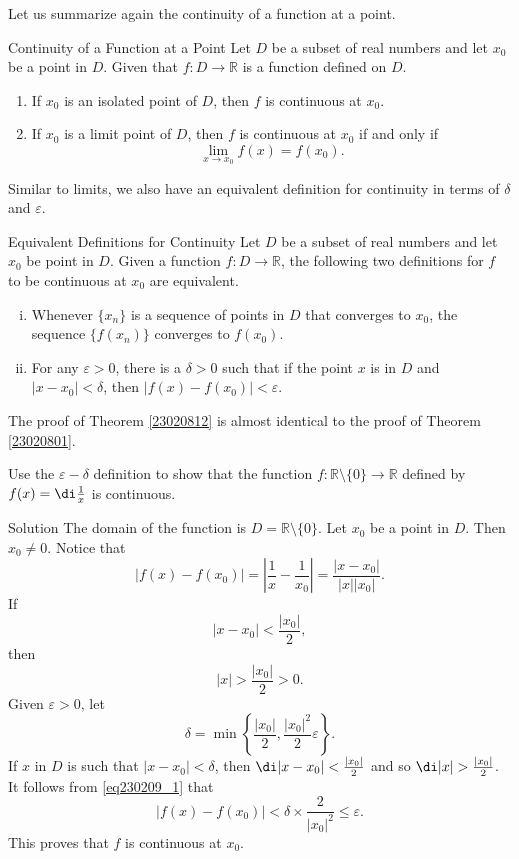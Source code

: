 Let us summarize again the continuity of a function at a point.
\begin{highlight}{Continuity of a Function at a Point}
Let $D$ be a subset of real numbers and let $x_0$ be a point in $D$. Given that $f:D\rightarrow \mathbb{R}$ is a function defined on $D$.
\begin{enumerate}[1.]
\item
If $x_0$ is an isolated point of $D$, then $f$ is continuous at $x_0$.
\item If $x_0$  is a limit point of $D$, then $f$ is continuous at $x_0$ if and only if 
\[\lim_{x\rightarrow x_0}f(x)=f(x_0).\]
\end{enumerate}
\end{highlight}


Similar to limits, we also have an equivalent definition for continuity in terms of $\delta$ and $\varepsilon$.
 \begin{theorem}[label=23020812]{Equivalent Definitions for Continuity}
  Let $D$ be a subset of real numbers and let $x_0$ be   point in $D$. Given a function $f:D\rightarrow \mathbb{R}$, 
  the following two definitions for 
   $f$ to be continuous at $x_0$ are equivalent.
  \begin{enumerate}[(i)]
  \item 
  Whenever $\{x_n\}$ is a sequence of points in $D $ that converges to $x_0$, the sequence $\{f(x_n)\}$ converges to $f(x_0)$. 
  \item For any $\varepsilon>0$, there is a $\delta>0$ such that if the point $x$ is in $D$ and $|x-x_0|<\delta$, then $|f(x)-f(x_0)|<\varepsilon$.
  \end{enumerate} 
 \end{theorem}
 The proof of Theorem \ref{23020812} is almost identical to the proof of Theorem \ref{23020801}.
 
 
\begin{example}{}
Use the $\varepsilon-\delta$ definition to show that the function $f:\mathbb{R}\setminus\{0\}\rightarrow \mathbb{R}$ defined by $f(x)=\di \frac{1}{x}$ is continuous.
\end{example}
 \begin{solution}{Solution}
The domain of the function is $D=\mathbb{R}\setminus\{0\}$. Let $x_0$ be a point in $D$. Then $x_0\neq 0$.  
Notice that \bs
\begin{equation}\label{eq230209_1}\left|f(x)-f(x_0)\right|=\left|\frac{1}{x}-\frac{1}{x_0}\right|=\frac{|x-x_0|}{|x||x_0|}.\end{equation}
If \[|x-x_0|<\frac{|x_0|}{2},\]
then
\[|x|> \frac{|x_0|}{2}>0.\]
Given $\varepsilon>0$, let
\[\delta=\min\left\{ \frac{|x_0|}{2}, \frac{|x_0|^2}{2}\varepsilon\right\}.\]If $x$ in $D$ is such that $|x-x_0|<\delta$, then $\di |x-x_0|<\frac{|x_0|}{2}$ and so $\di |x|> \frac{|x_0|}{2}$. It follows from \eqref{eq230209_1} that
\[\left|f(x)-f(x_0)\right|<\delta\times \frac{2}{|x_0|^2}\leq\varepsilon.\]
This proves that $f$ is continuous at $x_0$.
\end{solution}
 
